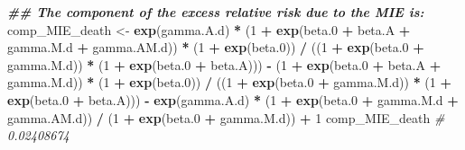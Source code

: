 \documentclass[
]{book}
\newenvironment{Shaded}{\begin{snugshade}}{\end{snugshade}}
\newcommand{\CommentTok}[1]{\textcolor[rgb]{0.56,0.35,0.01}{\textit{#1}}}
\newcommand{\DecValTok}[1]{\textcolor[rgb]{0.00,0.00,0.81}{#1}}
\newcommand{\DocumentationTok}[1]{\textcolor[rgb]{0.56,0.35,0.01}{\textbf{\textit{#1}}}}
\newcommand{\FloatTok}[1]{\textcolor[rgb]{0.00,0.00,0.81}{#1}}
\newcommand{\FunctionTok}[1]{\textcolor[rgb]{0.13,0.29,0.53}{\textbf{#1}}}
\newcommand{\NormalTok}[1]{#1}
\newcommand{\OtherTok}[1]{\textcolor[rgb]{0.56,0.35,0.01}{#1}}
\newcommand{\SpecialCharTok}[1]{\textcolor[rgb]{0.81,0.36,0.00}{\textbf{#1}}}
\begin{document}
\begin{Shaded}
\begin{Highlighting}[]
\DocumentationTok{\#\# The component of the excess relative risk due to the MIE is:}
\NormalTok{comp\_MIE\_death }\OtherTok{\textless{}{-}} \FunctionTok{exp}\NormalTok{(gamma.A.d) }\SpecialCharTok{*}\NormalTok{ (}\DecValTok{1} \SpecialCharTok{+} \FunctionTok{exp}\NormalTok{(beta}\FloatTok{.0} \SpecialCharTok{+}\NormalTok{ beta.A }\SpecialCharTok{+}\NormalTok{ gamma.M.d }\SpecialCharTok{+}
\NormalTok{                                              gamma.AM.d)) }\SpecialCharTok{*}\NormalTok{ (}\DecValTok{1} \SpecialCharTok{+} \FunctionTok{exp}\NormalTok{(beta}\FloatTok{.0}\NormalTok{)) }\SpecialCharTok{/}
\NormalTok{  ((}\DecValTok{1} \SpecialCharTok{+} \FunctionTok{exp}\NormalTok{(beta}\FloatTok{.0} \SpecialCharTok{+}\NormalTok{ gamma.M.d)) }\SpecialCharTok{*}\NormalTok{ (}\DecValTok{1} \SpecialCharTok{+} \FunctionTok{exp}\NormalTok{(beta}\FloatTok{.0} \SpecialCharTok{+}\NormalTok{ beta.A))) }\SpecialCharTok{{-}}
\NormalTok{  (}\DecValTok{1} \SpecialCharTok{+} \FunctionTok{exp}\NormalTok{(beta}\FloatTok{.0} \SpecialCharTok{+}\NormalTok{ beta.A }\SpecialCharTok{+}\NormalTok{ gamma.M.d)) }\SpecialCharTok{*}\NormalTok{ (}\DecValTok{1} \SpecialCharTok{+} \FunctionTok{exp}\NormalTok{(beta}\FloatTok{.0}\NormalTok{)) }\SpecialCharTok{/}
\NormalTok{  ((}\DecValTok{1} \SpecialCharTok{+} \FunctionTok{exp}\NormalTok{(beta}\FloatTok{.0} \SpecialCharTok{+}\NormalTok{ gamma.M.d)) }\SpecialCharTok{*}\NormalTok{ (}\DecValTok{1} \SpecialCharTok{+} \FunctionTok{exp}\NormalTok{(beta}\FloatTok{.0} \SpecialCharTok{+}\NormalTok{ beta.A))) }\SpecialCharTok{{-}}
  \FunctionTok{exp}\NormalTok{(gamma.A.d) }\SpecialCharTok{*}\NormalTok{ (}\DecValTok{1} \SpecialCharTok{+} \FunctionTok{exp}\NormalTok{(beta}\FloatTok{.0} \SpecialCharTok{+}\NormalTok{ gamma.M.d }\SpecialCharTok{+}\NormalTok{ gamma.AM.d)) }\SpecialCharTok{/}
\NormalTok{  (}\DecValTok{1} \SpecialCharTok{+} \FunctionTok{exp}\NormalTok{(beta}\FloatTok{.0} \SpecialCharTok{+}\NormalTok{ gamma.M.d)) }\SpecialCharTok{+} \DecValTok{1}
\NormalTok{comp\_MIE\_death}
\CommentTok{\# 0.02408674}


\end{Highlighting}
\end{Shaded}
\end{document}
